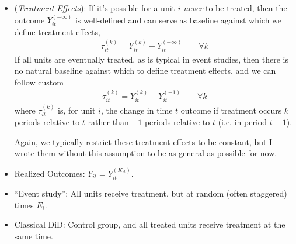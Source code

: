 \documentclass[12pt]{article}
\theoremstyle{plain}
\theoremstyle{definition}
\theoremstyle{remark}
\begin{document}
\begin{itemize}
  \item
    (\emph{Treatment Effects}):
    If it's possible for a unit $i$ \emph{never} to be treated,
    then the outcome $Y_{it}^{(-\infty)}$ is well-defined and can serve
    as baseline against which we define treatment effects,
    \begin{align*}
      \tau_{it}^{(k)}
      =
      Y_{it}^{(k)}
      -
      Y_{it}^{(-\infty)}
      \qquad
      \forall k
    \end{align*}
    If all units are eventually treated, as is typical in event studies,
    then there is no natural baseline against which to define treatment
    effects, and we can follow custom
    \begin{align*}
      \tau_{it}^{(k)}
      =
      Y_{it}^{(k)}
      -
      Y_{it}^{(-1)}
      \qquad
      \forall k
    \end{align*}
    where $\tau_{it}^{(k)}$ is, for unit $i$, the change in time $t$
    outcome if treatment occurs $k$ periods relative to $t$ rather than
    $-1$ periods relative to $t$ (i.e. in period $t-1$).

    Again, we typically restrict these treatment effects to be
    constant, but I wrote them without this assumption to be as general
    as possible for now.

  \item
    Realized Outcomes: $Y_{it}=Y_{it}^{(K_{it})}$.

  \item
    ``Event study'': All units receive treatment, but at random
    (often staggered) times $E_i$.

  \item
    Classical DiD:
    Control group, and all treated units receive treatment at the same
    time.
\end{itemize}
\end{document}

